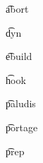 \begin{compactitem}
\item \t{abort}
\item \t{dyn}
\item \t{ebuild}
\item \t{hook}
\item \t{paludis}
\item \t{portage}
\item \t{prep}
\end{compactitem}


